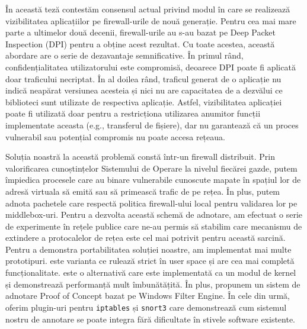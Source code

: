 În această teză contestăm consensul actual privind modul în care se realizează
vizibilitatea aplicațiilor pe firewall-urile de nouă generație. Pentru cea mai
mare parte a ultimelor două decenii, firewall-urile au s-au bazat pe Deep Packet
Inspection (DPI) pentru a obține acest rezultat. Cu toate acestea, această abordare
are o serie de dezavantaje semnificative. În primul rând, confidențialitatea
utilizatorului este compromisă, deoarece DPI poate fi aplicată doar traficului
necriptat. În al doilea rând, traficul generat de o aplicație nu indică neapărat
versiunea acesteia și nici nu are capacitatea de a dezvălui ce biblioteci sunt
utilizate de respectiva aplicație. Astfel, vizibilitatea aplicației poate
fi utilizată doar pentru a restricționa utilizarea anumitor funcții implementate
aceasta (e.g., transferul de fișiere), dar nu garantează că un proces vulnerabil
sau potențial compromis nu poate accesa rețeaua.

Soluția noastră la această problemă constă într-un firewall distribuit. Prin
valorificarea cunoștințelor Sistemului de Operare la nivelul fiecărei gazde,
putem împiedica procesele care au binare vulnerabile cunoscute mapate în spațiul
lor de adresă virtuala să emită sau să primească trafic de pe rețea. În plus,
putem adnota pachetele care respectă politica firewall-ului local pentru validarea
lor pe middlebox-uri. Pentru a dezvolta această schemă de adnotare, am efectuat
o serie de experimente în rețele publice care ne-au permis să stabilim care
mecanismu de extindere a protocalelor de rețea este cel mai potrivit pentru
această sarcină. Pentru a demonstra portabilitatea soluției noastre, am
implementat mai multe prototipuri. \daf{} este varianta ce rulează strict în
user space și are cea mai completă funcționalitate. \scout{} este o alternativă
care este implementată ca un modul de kernel și demonstrează performanță mult
îmbunătățită. În plus, propunem un sistem de adnotare Proof of Concept bazat pe
Windows Filter Engine. În cele din urmă, oferim plugin-uri pentru \texttt{iptables}
și \texttt{snort3} care demonstrează cum sistemul nostru de annotare se poate
integra fără dificultate în stivele software existente.

